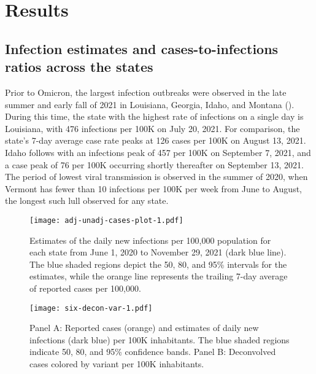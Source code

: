 \section{Results}
\label{sec:results}

\subsection{Infection estimates and cases-to-infections ratios across the \US states}
\label{sec:omitted-waves}

Prior to Omicron, the largest infection outbreaks were
observed in the late summer and early fall of 2021 in Louisiana, Georgia, Idaho,
and Montana (). During this time, 
the state with the highest rate of infections on a single day is Louisiana, 
with 476 infections per 100K on July 20, 2021. For comparison, 
the state's 7-day average case rate peaks at 126 cases per 100K on August 13, 2021. 
Idaho follows with an infections peak of 457 per 100K on September 7, 2021, 
and a case peak of 76 per 100K occurring shortly thereafter on September 13, 2021. 
The period of lowest viral transmission is observed in the summer of 2020, when 
Vermont has fewer than 10 infections per 100K per week from June to August, the
 longest such lull observed for any state. %

\begin{figure}[!tb]
\centering
\texttt{[image: adj-unadj-cases-plot-1.pdf]} 
\caption{Estimates of the daily new infections per 100,000 population
for each \US state from June 1, 2020 to November 29, 2021 (dark blue line). The
blue shaded regions depict the 50, 80, and 95\% intervals for the estimates,
while the orange line represents the trailing 7-day average of reported cases
per 100,000.}
\label{fig:state_infect_est}
\end{figure}    

\begin{figure}[!tb]
\centering
    \texttt{[image: six-decon-var-1.pdf]}
    \caption{Panel A: Reported cases (orange) and estimates of daily new
    infections (dark blue) per 100K inhabitants. The blue shaded regions
    indicate 50, 80, and 95\% confidence bands.  
    Panel B: Deconvolved cases colored by variant per 100K inhabitants.}
    \label{fig:six-states}
\end{figure}

